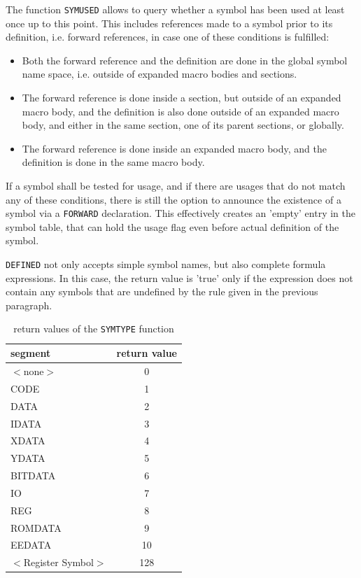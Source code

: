 \documentclass[12pt,twoside]{report}
\newcommand{\tty}[1]{{\tt #1}}
\begin{document}
\label{sect_symused}
The function \tty{SYMUSED} allows to query whether a symbol has been
used at least once up to this point.  This includes references made
to a symbol prior to its definition, i.e. forward references, in case
one of these conditions is fulfilled:
\begin{itemize}
\item{Both the forward reference and the definition are done in the
      global symbol name space, i.e. outside of expanded macro bodies
      and sections.}
\item{The forward reference is done inside a section, but outside of
      an expanded macro body, and the definition is also done outside
      of an expanded macro body, and either in the same section, one
      of its parent sections, or globally.}
\item{The forward reference is done inside an expanded macro body, and
      the definition is done in the same macro body.}
\end{itemize}
If a symbol shall be tested for usage, and if there are usages that
do not match any of these conditions, there is still the option to
announce the existence of a symbol via a \tty{FORWARD} declaration.
This effectively creates an 'empty' entry in the symbol table, that
can hold the usage flag even before actual definition of the symbol.

\tty{DEFINED} not only accepts simple symbol names, but also complete
formula expressions.  In this case, the return value is 'true' only if the
expression does not contain any symbols that are undefined by the rule
given in the previous paragraph.
\begin{table}[htb]
\begin{center}
\begin{tabular}{|l|c|}
\hline
segment & return value \\
\hline
$<$none$>$ & 0 \\
CODE & 1 \\
DATA & 2 \\
IDATA & 3 \\
XDATA & 4 \\
YDATA & 5 \\
BITDATA & 6 \\
IO & 7 \\
REG & 8 \\
ROMDATA & 9 \\
EEDATA & 10 \\
$<$Register Symbol$>$ & 128 \\
\hline
\end{tabular}
\end{center}
\caption{return values of the \tty{SYMTYPE} function\label{TabSegNums}}
\end{table}
\end{document}

